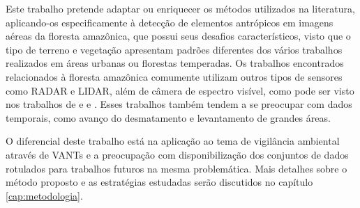 Este trabalho pretende adaptar ou enriquecer os métodos utilizados na literatura, aplicando-os especificamente à detecção de elementos antrópicos em imagens aéreas da floresta amazônica, que possui seus desafios característicos, visto que o tipo de terreno e vegetação apresentam padrões diferentes dos vários trabalhos realizados em áreas urbanas ou florestas temperadas. Os trabalhos encontrados relacionados à floresta amazônica comumente utilizam outros tipos de sensores como RADAR e LIDAR, além de câmera de espectro visível, como pode ser visto nos trabalhos de  e  e . Esses trabalhos também tendem a se preocupar com dados temporais, como avanço do desmatamento e levantamento de grandes áreas.

O diferencial deste trabalho está na aplicação ao tema de vigilância ambiental através de VANTs e a preocupação com disponibilização dos conjuntos de dados rotulados para trabalhos futuros na mesma problemática. Mais detalhes sobre o método proposto e as estratégias estudadas serão discutidos no capítulo \ref{cap:metodologia}.